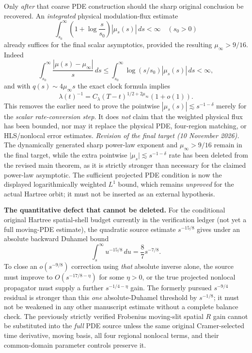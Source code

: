 \documentclass[11pt]{amsart}
\begin{document}
Only \emph{after} that coarse PDE construction should the
sharp original conclusion be recovered. An
\emph{integrated} physical modulation-flux estimate
\[
 \int_{s_0}^{\infty}
 \left(1+\log\frac{s}{s_0}\right)|\mu_s(s)|\,ds<\infty
 \quad(s_0>0)
\]
already suffices for the final scalar asymptotics, provided the
resulting \(\mu_\infty>9/16\). Indeed
\[
 \int_{s_0}^\infty
    \frac{|\mu(s)-\mu_\infty|}{s}\,ds
 \le\int_{s_0}^\infty
      \log(s/s_0)|\mu_s(s)|\,ds<\infty,
\]
and with \(q(s)\sim4\mu_\infty s\) the exact clock formula
implies
\[
 \lambda(t)^{-1}
 =C_\lambda(T-t)^{1/2+2\mu_\infty}(1+o(1)).
\]
This removes the earlier need to prove the pointwise
\(|\mu_s(s)|\lesssim s^{-1-\delta}\) merely for the
\emph{scalar rate-conversion step}. It does \emph{not} claim
that the weighted physical flux has been bounded, nor may it
replace the physical PDE, four-region matching, or
HLS/nonlocal error estimates.
\emph{Revision of the final target (10 November 2026).}
The dynamically generated sharp power-law exponent and
\(\mu_\infty>9/16\) remain in the final target, while the
extra pointwise \(\lvert\mu_s\rvert\lesssim s^{-1-\delta}\)
rate has been deleted from the revised main theorem,
as it is strictly stronger than necessary for the claimed
power-law asymptotic. The sufficient projected PDE condition
is now the displayed logarithmically weighted \(L^1\)
bound, which remains \emph{unproved} for the actual Hartree
orbit; it must not be inserted as an external hypothesis.

\medskip
\noindent\textbf{The quantitative defect that cannot be deleted.}
For the conditional original Hartree spatial-shell budget currently
in the verification ledger (not yet a full moving-PDE estimate),
the quadratic source estimate \(s^{-15/8}\) gives under
an absolute backward Duhamel bound
\[
 \int_s^\infty u^{-15/8}\,du=\frac87 s^{-7/8}.
\]
To close an \(o(s^{-9/8})\) correction using \emph{that} absolute
inverse alone, the source must improve to
\(O(s^{-17/8-\eta})\) for some \(\eta>0\), or the true
projected nonlocal propagator must supply a further
\(s^{-1/4-\eta}\) gain. The formerly pursued
\(s^{-9/4}\) residual is stronger than this \emph{one}
absolute-Duhamel threshold by \(s^{-1/8}\); it must
not be weakened in any other manuscript estimate without
a complete balance check.
The previously strictly verified Frobenius moving-slit
spatial \(R\) gain cannot be substituted into the
\emph{full} PDE source unless the same original Cramer-selected
time derivative, moving basis, all four regional nonlocal terms,
and their common-domain parameter controls preserve it.
\end{document}
